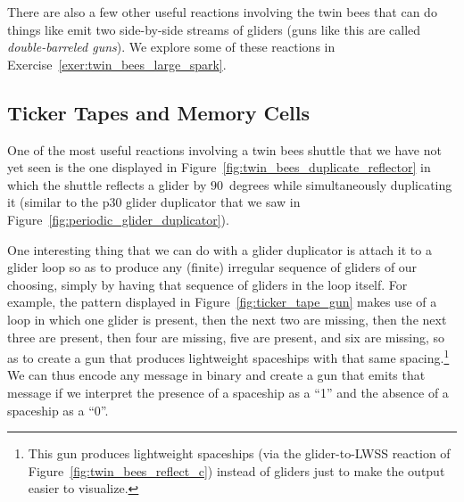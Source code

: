 There are also a few other useful reactions involving the twin bees that can do things like emit two side-by-side streams of gliders (guns like this are called \emph{double-barreled guns}). We explore some of these reactions in Exercise~\ref{exer:twin_bees_large_spark}.


\subsection{Ticker Tapes and Memory Cells}\label{sec:p46_ticker_tape}

One of the most useful reactions involving a twin bees shuttle that we have not yet seen is the one displayed in Figure~\ref{fig:twin_bees_duplicate_reflector} in which the shuttle reflects a glider by $90$~degrees while simultaneously duplicating it (similar to the p$30$ glider duplicator that we saw in Figure~\ref{fig:periodic_glider_duplicator}).

One interesting thing that we can do with a glider duplicator is attach it to a glider loop so as to produce any (finite) irregular sequence of gliders of our choosing, simply by having that sequence of gliders in the loop itself. For example, the pattern displayed in Figure~\ref{fig:ticker_tape_gun} makes use of a loop in which one glider is present, then the next two are missing, then the next three are present, then four are missing, five are present, and six are missing, so as to create a gun that produces lightweight spaceships with that same spacing.\footnote{This gun produces lightweight spaceships (via the glider-to-LWSS reaction of Figure~\ref{fig:twin_bees_reflect_c}) instead of gliders just to make the output easier to visualize.} We can thus encode any message in binary and create a gun that emits that message if we interpret the presence of a spaceship as a ``1'' and the absence of a spaceship as a ``0''.

